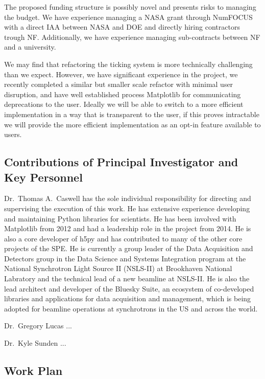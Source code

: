 \documentclass[12pt]{article}
\numberwithin{page}{section}
\begin{document}
The proposed funding structure is possibly novel and presents risks to managing
the budget.   We have experience managing a NASA grant through NumFOCUS with a
direct IAA between NASA and DOE and directly hiring contractors trough NF.
Additionally, we have experience managing sub-contracts between NF and a
university.

We may find that refactoring the ticking system is more technically challenging
than we expect.  However, we have significant experience in the project, we
recently completed a similar but smaller scale refactor with minimal user
disruption, and have well established process Matplotlib for communicating
deprecations to the user.  Ideally we will be able to switch to a more
efficient implementation in a way that is transparent to the user, if this proves
intractable we will provide the more efficient implementation as an opt-in feature
available to users.


\subsection{Contributions of Principal Investigator and Key Personnel}

Dr.\ Thomas A.\ Caswell has the sole individual responsibility for directing
and supervising the execution of this work.  He has extensive experience
developing and maintaining Python libraries for scientists.  He has been
involved with Matplotlib from 2012 and had a leadership role in the project
from 2014.  He is also a core developer of h5py and has contributed to many of
the other core projects of the SPE.  He is currently a group leader of the Data
Acquisition and Detectors group in the Data Science and Systems Integration
program at the National Synchrotron Light Source II (NSLS-II) at Brookhaven
National Labratory and the technical lead of a new beamline at NSLS-II.  He is
also the lead architect and developer of the Bluesky Suite, an ecosystem of
co-developed libraries and applications for data acquisition and management,
which is being adopted for beamline operations at synchrotrons in the US and
across the world.

Dr.\ Gregory Lucas ...

Dr.\ Kyle Sunden ...


\subsection{Work Plan}
\end{document}
